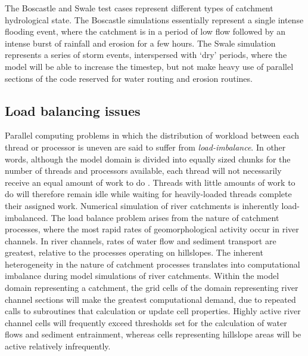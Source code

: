 The Boscastle and Swale test cases represent different types of catchment hydrological state. The Boscastle simulations essentially represent a single intense flooding event, where the catchment is in a period of low flow followed by an intense burst of rainfall and erosion for a few hours. The Swale simulation represents a series of storm events, interspersed with `dry' periods, where the model will be able to increase the timestep, but not make heavy use of parallel sections of the code reserved for water routing and erosion routines. 

\subsection{Load balancing issues}
\label{sec_loadbalance}
Parallel computing problems in which the distribution of workload between each thread or processor is uneven are said to suffer from \textit{load-imbalance}. In other words, although the model domain is divided into equally sized chunks for the number of threads and processors available, each thread will not necessarily receive an equal amount of work to do \citep{sakellariou1996quest}. Threads with little amounts of work to do will therefore remain idle while waiting for  heavily-loaded threads complete their assigned work. Numerical simulation of river catchments is inherently load-imbalanced. The load balance problem arises from the nature of catchment processes, where the most rapid rates of geomorphological activity occur in river channels. In river channels, rates of water flow and sediment transport are greatest, relative to the processes operating on hillslopes. The inherent heterogeneity in the nature of catchment processes translates into computational imbalance during model simulations of river catchments. Within the model domain representing a catchment, the grid cells of the domain representing river channel sections will make the greatest computational demand, due to repeated calls to subroutines that calculation or update cell properties. Highly active river channel cells will frequently exceed thresholds set for the calculation of water flows and sediment entrainment, whereas cells representing hillslope areas will be active relatively infrequently.

